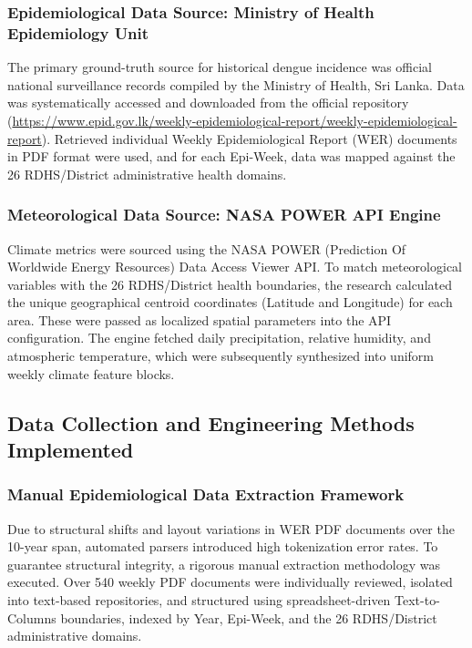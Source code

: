 \documentclass[12pt,a4paper]{article}
\begin{document}
\subsubsection{Epidemiological Data Source: Ministry of Health Epidemiology Unit}
The primary ground-truth source for historical dengue incidence was official national surveillance records compiled by the Ministry of Health, Sri Lanka. Data was systematically accessed and downloaded from the official repository (\url{https://www.epid.gov.lk/weekly-epidemiological-report/weekly-epidemiological-report}). Retrieved individual Weekly Epidemiological Report (WER) documents in PDF format were used, and for each Epi-Week, data was mapped against the 26 RDHS/District administrative health domains.

\subsubsection{Meteorological Data Source: NASA POWER API Engine}
Climate metrics were sourced using the NASA POWER (Prediction Of Worldwide Energy Resources) Data Access Viewer API. To match meteorological variables with the 26 RDHS/District health boundaries, the research calculated the unique geographical centroid coordinates (Latitude and Longitude) for each area. These were passed as localized spatial parameters into the API configuration. The engine fetched daily precipitation, relative humidity, and atmospheric temperature, which were subsequently synthesized into uniform weekly climate feature blocks.

\subsection{Data Collection and Engineering Methods Implemented}
\subsubsection{Manual Epidemiological Data Extraction Framework}
Due to structural shifts and layout variations in WER PDF documents over the 10-year span, automated parsers introduced high tokenization error rates. To guarantee structural integrity, a rigorous manual extraction methodology was executed. Over 540 weekly PDF documents were individually reviewed, isolated into text-based repositories, and structured using spreadsheet-driven Text-to-Columns boundaries, indexed by Year, Epi-Week, and the 26 RDHS/District administrative domains.
\end{document}
